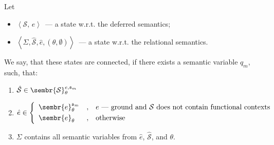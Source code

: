 \begin{definition}
\normalfont Let 
\begin{itemize}
\item \mbox{$\left<\mathcal S,\,e\right>$}~--- a state w.r.t. the deferred semantics;
\item \mbox{$\left<\Sigma, \hat{\mathcal S}, \hat{e}, (\theta, \emptyset)\right>$}~--- a state w.r.t. the
relational semantics.
\end{itemize} 

We say, that these states are connected, if there exists a semantic variable $q_m$, such, that:\vspace{1mm}

\begin{enumerate}
\item \mbox{$\hat{\mathcal S}\in\sembr{\mathcal S}^{e,{\mathfrak s}_m}_\theta$}\vspace{1mm}
\item \mbox{$\hat{e}\in\left\{
                          \begin{array}{lcl}
                            \sembr{e}^{{\mathfrak s}_m}_\theta&,&e\mbox{~--- ground and }\mathcal S\mbox{ does not contain functional contexts}\\[1mm]
                            \sembr{e}_\theta&,&\mbox{otherwise}
                          \end{array}
                       \right.
            $} 
\item $\Sigma$ contains all semantic variables from $\hat{e}$, $\hat{\mathcal S}$, and $\theta$.
\end{enumerate}

\end{definition}


